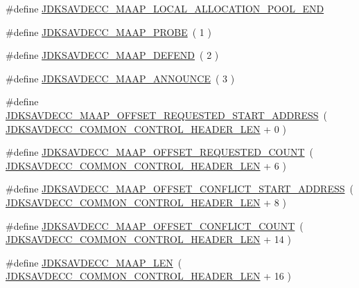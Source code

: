 \begin{DoxyCompactItemize}
\item 
\#define \hyperlink{group__maap_ga5a78755bb5eaba85874f87f29f33aee0}{J\+D\+K\+S\+A\+V\+D\+E\+C\+C\+\_\+\+M\+A\+A\+P\+\_\+\+L\+O\+C\+A\+L\+\_\+\+A\+L\+L\+O\+C\+A\+T\+I\+O\+N\+\_\+\+P\+O\+O\+L\+\_\+\+E\+ND}
\item 
\#define \hyperlink{group__maap_gaa7812d0cb8624ea9c07cb6e714bb7e88}{J\+D\+K\+S\+A\+V\+D\+E\+C\+C\+\_\+\+M\+A\+A\+P\+\_\+\+P\+R\+O\+BE}~( 1 )
\item 
\#define \hyperlink{group__maap_ga9b414558b129efd4b0edfd1cea17bfea}{J\+D\+K\+S\+A\+V\+D\+E\+C\+C\+\_\+\+M\+A\+A\+P\+\_\+\+D\+E\+F\+E\+ND}~( 2 )
\item 
\#define \hyperlink{group__maap_ga45548bfca1b80deda951d25ffb75dc18}{J\+D\+K\+S\+A\+V\+D\+E\+C\+C\+\_\+\+M\+A\+A\+P\+\_\+\+A\+N\+N\+O\+U\+N\+CE}~( 3 )
\item 
\#define \hyperlink{group__maap_gaa6e1c9777b7d55a49990310c82c2e01b}{J\+D\+K\+S\+A\+V\+D\+E\+C\+C\+\_\+\+M\+A\+A\+P\+\_\+\+O\+F\+F\+S\+E\+T\+\_\+\+R\+E\+Q\+U\+E\+S\+T\+E\+D\+\_\+\+S\+T\+A\+R\+T\+\_\+\+A\+D\+D\+R\+E\+SS}~( \hyperlink{group__jdksavdecc__avtp__common__control__header_gaae84052886fb1bb42f3bc5f85b741dff}{J\+D\+K\+S\+A\+V\+D\+E\+C\+C\+\_\+\+C\+O\+M\+M\+O\+N\+\_\+\+C\+O\+N\+T\+R\+O\+L\+\_\+\+H\+E\+A\+D\+E\+R\+\_\+\+L\+EN} + 0 )
\item 
\#define \hyperlink{group__maap_ga2ae31eb4ee8d271ba09c3ddfac65c0ce}{J\+D\+K\+S\+A\+V\+D\+E\+C\+C\+\_\+\+M\+A\+A\+P\+\_\+\+O\+F\+F\+S\+E\+T\+\_\+\+R\+E\+Q\+U\+E\+S\+T\+E\+D\+\_\+\+C\+O\+U\+NT}~( \hyperlink{group__jdksavdecc__avtp__common__control__header_gaae84052886fb1bb42f3bc5f85b741dff}{J\+D\+K\+S\+A\+V\+D\+E\+C\+C\+\_\+\+C\+O\+M\+M\+O\+N\+\_\+\+C\+O\+N\+T\+R\+O\+L\+\_\+\+H\+E\+A\+D\+E\+R\+\_\+\+L\+EN} + 6 )
\item 
\#define \hyperlink{group__maap_ga80c82c02aa0e3ca6b1430b5d9a43811a}{J\+D\+K\+S\+A\+V\+D\+E\+C\+C\+\_\+\+M\+A\+A\+P\+\_\+\+O\+F\+F\+S\+E\+T\+\_\+\+C\+O\+N\+F\+L\+I\+C\+T\+\_\+\+S\+T\+A\+R\+T\+\_\+\+A\+D\+D\+R\+E\+SS}~( \hyperlink{group__jdksavdecc__avtp__common__control__header_gaae84052886fb1bb42f3bc5f85b741dff}{J\+D\+K\+S\+A\+V\+D\+E\+C\+C\+\_\+\+C\+O\+M\+M\+O\+N\+\_\+\+C\+O\+N\+T\+R\+O\+L\+\_\+\+H\+E\+A\+D\+E\+R\+\_\+\+L\+EN} + 8 )
\item 
\#define \hyperlink{group__maap_gaccacf622b27f9b634ddcf04f09ee2e91}{J\+D\+K\+S\+A\+V\+D\+E\+C\+C\+\_\+\+M\+A\+A\+P\+\_\+\+O\+F\+F\+S\+E\+T\+\_\+\+C\+O\+N\+F\+L\+I\+C\+T\+\_\+\+C\+O\+U\+NT}~( \hyperlink{group__jdksavdecc__avtp__common__control__header_gaae84052886fb1bb42f3bc5f85b741dff}{J\+D\+K\+S\+A\+V\+D\+E\+C\+C\+\_\+\+C\+O\+M\+M\+O\+N\+\_\+\+C\+O\+N\+T\+R\+O\+L\+\_\+\+H\+E\+A\+D\+E\+R\+\_\+\+L\+EN} + 14 )
\item 
\#define \hyperlink{group__maap_ga554b0e25c8ea77e28e7720dd4662758b}{J\+D\+K\+S\+A\+V\+D\+E\+C\+C\+\_\+\+M\+A\+A\+P\+\_\+\+L\+EN}~( \hyperlink{group__jdksavdecc__avtp__common__control__header_gaae84052886fb1bb42f3bc5f85b741dff}{J\+D\+K\+S\+A\+V\+D\+E\+C\+C\+\_\+\+C\+O\+M\+M\+O\+N\+\_\+\+C\+O\+N\+T\+R\+O\+L\+\_\+\+H\+E\+A\+D\+E\+R\+\_\+\+L\+EN} + 16 )
\end{DoxyCompactItemize}

